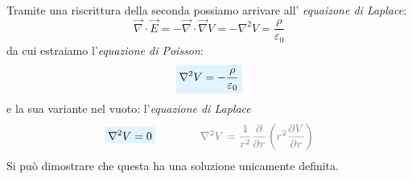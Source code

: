 \documentclass[x11names]{report}
\begin{document}
Tramite una riscrittura della seconda possiamo arrivare all' \textit{equaizone di Laplace}:
\[
\vec{\nabla} \cdot \vec{E} = - \vec{\nabla} \cdot \vec{\nabla}V = - \nabla^2V = \frac{\rho}{\varepsilon_0}
\]
da cui estraiamo l'\textit{equazione di Poisson}:
\begin{equation}
	\viola{\nabla^2V = -\frac{\rho}{\varepsilon_0} }
\end{equation}
e la sua variante nel vuoto: l'\textit{equazione di Laplace}
\begin{equation}
	\viola{\nabla^2V = 0} \qquad\qquad \textcolor{gray}{\nabla^2V = \frac{1}{r^2}\frac{\partial}{\partial r}\left(r^2\frac{\partial V}{\partial r}\right) }
\end{equation}
Si può dimostrare che questa ha una soluzione unicamente definita.
\newpage
\end{document}
